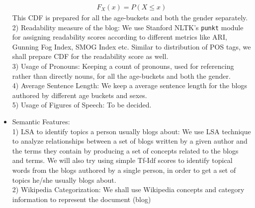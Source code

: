 \documentclass{sig-alternate}
\begin{document}
\begin{itemize}
\begin{align}
F_X(x) = P(X \leq x)
\end{align}
This CDF is prepared for all the age-buckets and both the gender separately.\\
2) Readability measure of the blog: We use Stanford NLTK's \texttt{punkt} module for assigning readability scores according to different metrics like ARI, Gunning Fog Index, SMOG Index etc. Similar to distribution of POS tags, we shall prepare CDF for the readability score as well.\\ 
3) Usage of Pronouns: Keeping a count of pronouns, used for referencing rather than directly nouns, for all the age-buckets and both the gender.\\
4) Average Sentence Length: We keep a average sentence length for the blogs authored by different age buckets and sexes.\\
5) Usage of Figures of Speech: To be decided.
\item Semantic Features:\\
1) LSA to identify topics a person usually blogs about: We use LSA technique to analyze relationships between a set of blogs written by a given author and the terms they contain by producing a set of concepts related to the blogs and terms. We will also try using simple Tf-Idf scores to identify topical words from the blogs authored by a single person, in order to get a set of topics he/she usually blogs about.\\
2) Wikipedia Categorization: We shall use Wikipedia concepts and category information to represent the document (blog) \cite{iiit-god}
\end{itemize}
\end{document}
